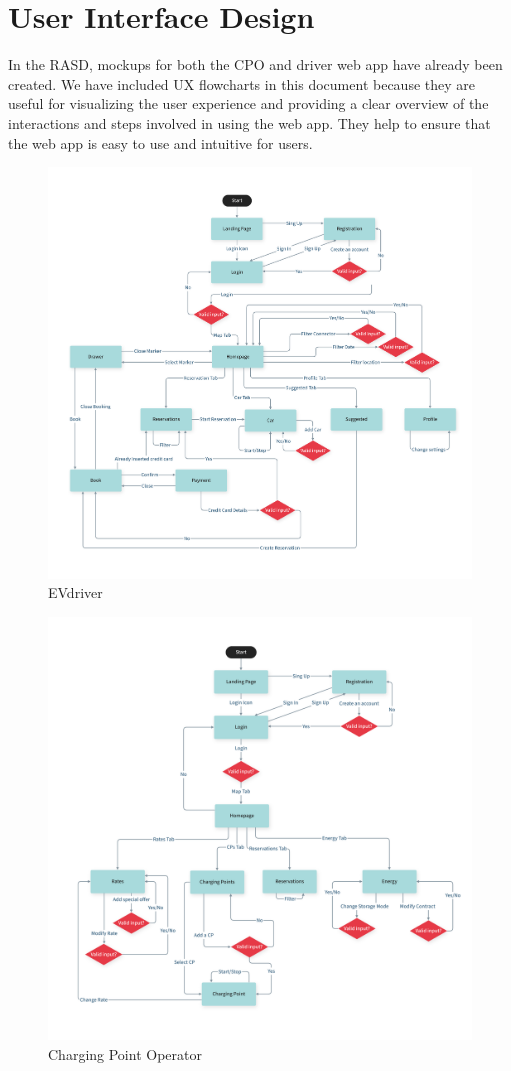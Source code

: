 \section{User Interface Design}
In the RASD, mockups for both the CPO and driver web app have already been created. We have included UX flowcharts in this document because they are useful for visualizing the user experience and providing a clear overview of the interactions and steps involved in using the web app. They help to ensure that the web app is easy to use and intuitive for users.

\begin{figure}[H]
    \centering
    \includegraphics[scale=0.41]{src/UIDesign/User.pdf}
    \caption{EVdriver}
\end{figure} \vspace{1cm}

\begin{figure}[H]
    \centering
    \includegraphics[scale=0.41]{src/UIDesign/Cpo.pdf}
    \caption{Charging Point Operator}
\end{figure} \vspace{1cm}